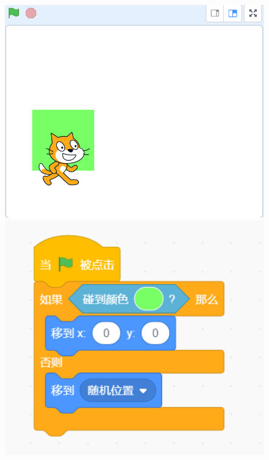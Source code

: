 \documentclass[10pt, a4paper]{article}
\begin{document}
\begin{enumerate}
        \begin{figure}[htbp]
            \centering
            \begin{minipage}[t]{.4\textwidth}
                \centering
                \begin{minipage}[t]{.45\textwidth}
                    \centering
                    \includegraphics[width=\textwidth]{8-1.png}
                \end{minipage}
                \begin{minipage}[t]{.45\textwidth}
                    \centering
                    \includegraphics[width=1\textwidth]{8-3.png}

\end{minipage}
\end{minipage}
\end{figure}
\end{enumerate}
\end{document}
